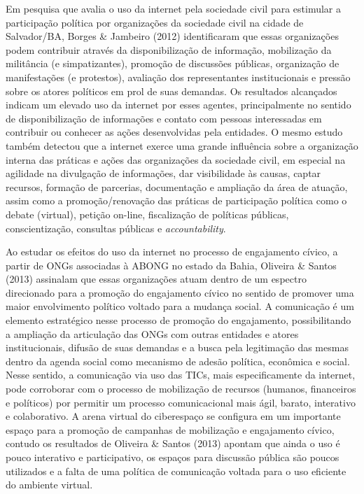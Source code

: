 Em pesquisa que avalia o uso da internet pela sociedade civil para
estimular a participação política por organizações da sociedade civil na
cidade de Salvador/BA, Borges \& Jambeiro (2012) identificaram que essas
organizações podem contribuir através da disponibilização de informação,
mobilização da militância (e simpatizantes), promoção de discussões
públicas, organização de manifestações (e protestos), avaliação dos
representantes institucionais e pressão sobre os atores políticos em
prol de suas demandas. Os resultados alcançados indicam um elevado uso
da internet por esses agentes, principalmente no sentido de
disponibilização de informações e contato com pessoas interessadas em
contribuir ou conhecer as ações desenvolvidas pela entidades. O mesmo
estudo também detectou que a internet exerce uma grande influência sobre
a organização interna das práticas e ações das organizações da sociedade
civil, em especial na agilidade na divulgação de informações, dar
visibilidade às causas, captar recursos, formação de parcerias,
documentação e ampliação da área de atuação, assim como a
promoção/renovação das práticas de participação política como o debate
(virtual), petição on-line, fiscalização de políticas públicas,
conscientização, consultas públicas e \emph{accountability}.

Ao estudar os efeitos do uso da internet no processo de engajamento
cívico, a partir de ONGs associadas à ABONG no estado da Bahia, Oliveira
\& Santos (2013) assinalam que essas organizações atuam dentro de um
espectro direcionado para a promoção do engajamento cívico no sentido de
promover uma maior envolvimento político voltado para a mudança social.
A comunicação é um elemento estratégico nesse processo de promoção do
engajamento, possibilitando a ampliação da articulação das ONGs com
outras entidades e atores institucionais, difusão de suas demandas e a
busca pela legitimação das mesmas dentro da agenda social como mecanismo
de adesão política, econômica e social. Nesse sentido, a comunicação via
uso das TICs, mais especificamente da internet, pode corroborar com o
processo de mobilização de recursos (humanos, financeiros e políticos)
por permitir um processo comunicacional mais ágil, barato, interativo e
colaborativo. A arena virtual do ciberespaço se configura em um
importante espaço para a promoção de campanhas de mobilização e
engajamento cívico, contudo os resultados de Oliveira \& Santos (2013)
apontam que ainda o uso é pouco interativo e participativo, os espaços
para discussão pública são poucos utilizados e a falta de uma política
de comunicação voltada para o uso eficiente do ambiente virtual.


